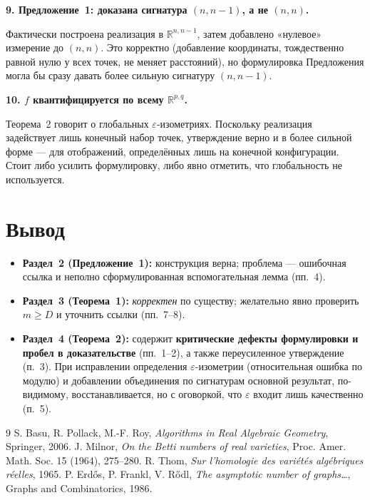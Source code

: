 \documentclass[12pt]{article}
\newcommand{\R}{\mathbb{R}}
\begin{document}
\begin{minbox}
\textbf{9. Предложение~1: доказана сигнатура $(n,n-1)$, а не $(n,n)$.}

Фактически построена реализация в $\R^{n,n-1}$, затем добавлено «нулевое» измерение до $(n,n)$. Это корректно (добавление координаты, тождественно равной нулю у всех точек, не меняет расстояний), но формулировка Предложения могла бы сразу давать более сильную сигнатуру $(n,n-1)$.
\end{minbox}

\begin{minbox}
\textbf{10. $f$ квантифицируется по всему $\R^{p,q}$.}

Теорема~2 говорит о глобальных $\varepsilon$-изометриях. Поскольку реализация задействует лишь конечный набор точек, утверждение верно и в более сильной форме — для отображений, определённых лишь на конечной конфигурации. Стоит либо усилить формулировку, либо явно отметить, что глобальность не используется.
\end{minbox}

\section{Вывод}

\begin{itemize}[leftmargin=1.4em]
  \item \textbf{Раздел~2 (Предложение~1):} конструкция верна; проблема — ошибочная ссылка и неполно сформулированная вспомогательная лемма (пп.~4).
  \item \textbf{Раздел~3 (Теорема~1):} \emph{корректен} по существу; желательно явно проверить $m\ge D$ и уточнить ссылки (пп.~7--8).
  \item \textbf{Раздел~4 (Теорема~2):} содержит \textbf{критические дефекты формулировки и пробел в доказательстве} (пп.~1--2), а также переусиленное утверждение (п.~3). При исправлении определения $\varepsilon$-изометрии (относительная ошибка по модулю) и добавлении объединения по сигнатурам основной результат, по-видимому, восстанавливается, но с оговоркой, что $\varepsilon$ входит лишь качественно (п.~5).
\end{itemize}

\begin{thebibliography}{9}
S. Basu, R. Pollack, M.-F. Roy, \emph{Algorithms in Real Algebraic Geometry}, Springer, 2006.
J. Milnor, \emph{On the Betti numbers of real varieties}, Proc. Amer. Math. Soc. 15 (1964), 275--280.
R. Thom, \emph{Sur l'homologie des vari\'et\'es alg\'ebriques r\'eelles}, 1965.
P. Erdős, P. Frankl, V. Rődl, \emph{The asymptotic number of graphs\ldots}, Graphs and Combinatorics, 1986.
\end{thebibliography}
\end{document}
